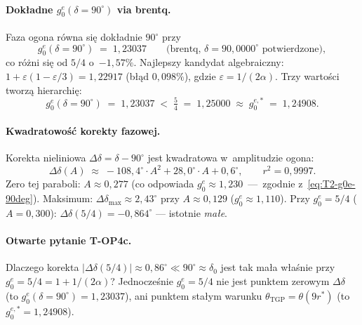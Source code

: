 \begin{observation}
  \paragraph{Dok\l{}adne $g_0^e(\delta=90^\circ)$ via brentq.}
  Faza ogona r\'owna si\k{e} dok\l{}adnie $90^\circ$ przy
  \begin{equation}\label{eq:T2-g0e-90deg}
    g_0^e(\delta=90^\circ) \;=\; 1{,}23037
    \qquad\bigl(\text{brentq, } \delta=90{,}0000^\circ \text{ potwierdzone}\bigr),
  \end{equation}
  co r\'o\.zni si\k{e} od $5/4$ o~$-1{,}57\%$.
  Najlepszy kandydat algebraiczny:
  $1 + \varepsilon(1-\varepsilon/3) = 1{,}22917$ (b\l\k{a}d $0{,}098\%$),
  gdzie $\varepsilon = 1/(2\alpha)$.
  Trzy warto\'sci tworz\k{a} hierarchi\k{e}:
  \begin{equation}\label{eq:T2-three-g0e}
    g_0^e(\delta=90^\circ) \;=\; 1{,}23037
    \;<\; \tfrac{5}{4} \;=\; 1{,}25000
    \;\approx\; g_0^{e,*} \;=\; 1{,}24908.
  \end{equation}

  \paragraph{Kwadratowo\'s\'c korekty fazowej.}
  Korekta nieliniowa $\Delta\delta = \delta - 90^\circ$ jest
  kwadratowa w~amplitudzie ogona:
  \begin{equation}\label{eq:T2-Ddelta-quad}
    \Delta\delta(A) \;\approx\;
    -108{,}4^\circ \cdot A^2 + 28{,}0^\circ \cdot A + 0{,}6^\circ,
    \qquad r^2 = 0{,}9997.
  \end{equation}
  Zero tej paraboli: $A \approx 0{,}277$ (co odpowiada
  $g_0^e \approx 1{,}230$~---~zgodnie z~\eqref{eq:T2-g0e-90deg}).
  Maksimum: $\Delta\delta_{\max} \approx 2{,}43^\circ$ przy
  $A \approx 0{,}129$ ($g_0^e \approx 1{,}110$).
  Przy $g_0^e = 5/4$ ($A = 0{,}300$):
  $\Delta\delta(5/4) = -0{,}864^\circ$ --- istotnie \emph{ma\l{}e}.

  \paragraph{Otwarte pytanie T-OP4c.}
  Dlaczego korekta $|\Delta\delta(5/4)| \approx 0{,}86^\circ \ll 90^\circ
  \approx \delta_0$ jest tak ma\l{}a w\l{}a\'snie przy $g_0^e = 5/4
  = 1+1/(2\alpha)$?  Jednocze\'snie $g_0^e = 5/4$ nie jest punktem
  zerowym $\Delta\delta$ (to $g_0^e(\delta=90^\circ) = 1{,}23037$),
  ani punktem sta\l{}ym warunku $\theta_{\mathrm{TGP}} = \theta(9r^*)$
  (to $g_0^{e,*} = 1{,}24908$).
\end{observation}

